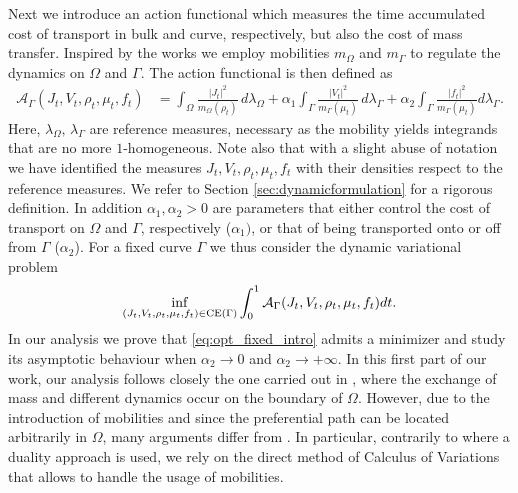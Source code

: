 \documentclass{article}
\def\calA{{\mathcal A}} \def\calB{{\mathcal B}} \def\calC{{\mathcal C}}
\begin{document}
Next we introduce an action functional which measures the time accumulated cost of transport in bulk and curve, respectively, but also the cost of mass transfer. Inspired by the works \cite{Dolbeault_2008, Lisini2010} we employ mobilities $m_\Omega$ and $m_\Gamma$ to regulate the dynamics on $\Omega$ and $\Gamma$.
 The action functional is then defined as  
\begin{align}\label{eq:BB}\tag{BB}
\calA_\Gamma(J_t, V_t, \rho_t, \mu_t, f_t) &= \int_{\Omega} \frac{|J_t|^2}{m_\Omega(\rho_t)} \, d\lambda_\Omega 
+ \alpha_1  \int_{\Gamma} \frac{|V_t|^2}{m_\Gamma(\mu_t)} \, d\lambda_\Gamma
+ \alpha_2  \int_{\Gamma} \frac{|f_t|^2}{m_\Gamma(\mu_t)} d\lambda_\Gamma.
\end{align}
Here, $\lambda_\Omega,\,\lambda_\Gamma$ are reference measures, necessary as the mobility yields integrands that are no more $1$-homogeneous. 
Note also that with a slight abuse of notation we have identified the measures $J_t, V_t, \rho_t, \mu_t, f_t$ with their densities respect to the reference measures. We refer to Section \ref{sec:dynamicformulation} for a rigorous definition. In addition $\alpha_1, \alpha_2 >0$ are parameters that either control the cost of transport on $\Omega$ and $\Gamma$, respectively ($\alpha_1)$, or that of being transported onto or off from $\Gamma$ ($\alpha_2$). For a fixed curve $\Gamma$ we thus consider the dynamic  variational problem
\begin{align}\label{eq:opt_fixed_intro}
\inf_{(J_t, V_t, \rho_t, \mu_t, f_t) \in {\rm CE}(\Gamma)} \int_0^1 \calA_\Gamma(J_t, V_t, \rho_t, \mu_t, f_t) dt.
\end{align}
In our analysis we prove that \eqref{eq:opt_fixed_intro} admits a minimizer and study its asymptotic behaviour when $\alpha_2 \rightarrow 0$ and $\alpha_2 \rightarrow +\infty$. In this first part of our work, our analysis follows closely the one carried out in \cite{monsaingeon2021new}, where the exchange of mass and different dynamics occur on the boundary of $\Omega$. However, due to the introduction of mobilities and since the preferential path can be located arbitrarily in $\Omega$, many arguments differ from \cite{monsaingeon2021new}. In particular, contrarily to \cite{monsaingeon2021new} where a duality approach is used, we rely on the direct method of Calculus of Variations that allows to handle the usage of mobilities.  
\end{document}
